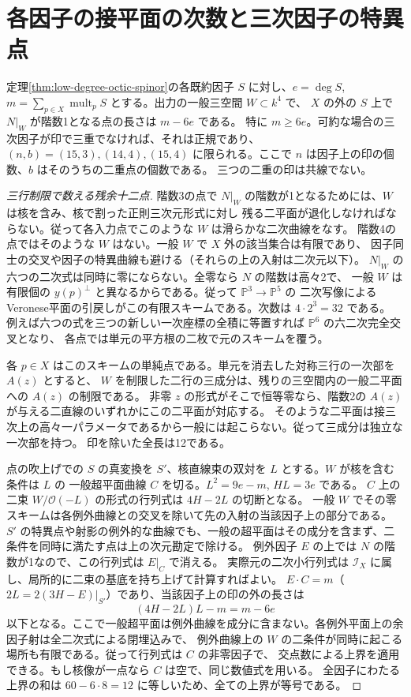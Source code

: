 \section{各因子の接平面の次数と三次因子の特異点}
\label{sec:cubic-octic-tangent-planes}
\begin{theorem}\label{thm:cubic-octic-tangent-planes}
定理\ref{thm:low-degree-octic-spinor}の各既約因子 $S$ に対し、$e=\deg S$,
$m=\sum_{p\in X}\operatorname{mult}_p S$ とする。出力の一般三空間 $W\subset k^4$ で、
$X$ の外の $S$ 上で $N|_W$ が階数1となる点の長さは $m-6e$ である。
特に $m\ge6e$。可約な場合の三次因子が印で三重でなければ、それは正規であり、
$(n,b)=(15,3),(14,4),(15,4)$ に限られる。ここで $n$ は因子上の印の個数、$b$ はそのうちの二重点の個数である。
三つの二重の印は共線でない。
\end{theorem}
\begin{proof}[三行制限で数える残余十二点]
階数3の点で $N|_W$ の階数が1となるためには、$W$ は核を含み、核で割った正則三次元形式に対し
残る二平面が退化しなければならない。従って各入力点でこのような $W$ は滑らかな二次曲線をなす。
階数4の点ではそのような $W$ はない。一般 $W$ で $X$ 外の該当集合は有限であり、
因子同士の交叉や因子の特異曲線も避ける（それらの上の入射は二次元以下）。
$N|_W$ の六つの二次式は同時に零にならない。全零なら $N$ の階数は高々2で、
一般 $W$ は有限個の $y(p)^\perp$ と異なるからである。従って $\mathbb P^3\to\mathbb P^5$ の
二次写像によるVeronese平面の引戻しがこの有限スキームである。次数は $4\cdot2^3=32$ である。
例えば六つの式を三つの新しい一次座標の全積に等置すれば $\mathbb P^6$ の六二次完全交叉となり、
各点では単元の平方根の二枚で元のスキームを覆う。

各 $p\in X$ はこのスキームの単純点である。単元を消去した対称三行の一次部を $A(z)$ とすると、
$W$ を制限した二行の三成分は、残りの三空間内の一般二平面への $A(z)$ の制限である。
非零 $z$ の形式がそこで恒等零なら、階数2の $A(z)$ が与える二直線のいずれかにこの二平面が対応する。
そのような二平面は接三次上の高々一パラメータであるから一般には起こらない。従って三成分は独立な一次部を持つ。
印を除いた全長は12である。

点の吹上げでの $S$ の真変換を $S'$、核直線束の双対を $L$ とする。$W$ が核を含む条件は $L$ の
一般超平面曲線 $C$ を切る。$L^2=9e-m$, $HL=3e$ である。
$C$ 上の二束 $W/\mathcal O(-L)$ の形式の行列式は $4H-2L$ の切断となる。
一般 $W$ でその零スキームは各例外曲線との交叉を除いて先の入射の当該因子上の部分である。
$S'$ の特異点や射影の例外的な曲線でも、一般の超平面はその成分を含まず、二条件を同時に満たす点は上の次元勘定で除ける。
例外因子 $E$ の上では $N$ の階数が1なので、この行列式は $E|_C$ で消える。
実際元の二次小行列式は $\mathcal I_X$ に属し、局所的に二束の基底を持ち上げて計算すればよい。
$E\cdot C=m$（$2L=2(3H-E)|_{S'}$）であり、当該因子上の印の外の長さは
\[
                (4H-2L)L-m=m-6e
\]
以下となる。ここで一般超平面は例外曲線を成分に含まない。各例外平面上の余因子射は全二次式による閉埋込みで、
例外曲線上の $W$ の二条件が同時に起こる場所も有限である。従って行列式は $C$ の非零因子で、
交点数による上界を適用できる。もし核像が一点なら $C$ は空で、同じ数値式を用いる。
全因子にわたる上界の和は $60-6\cdot8=12$ に等しいため、全ての上界が等号である。
\end{proof}
